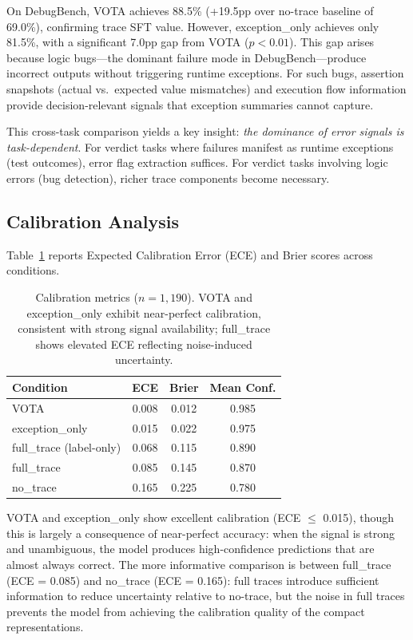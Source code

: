 \documentclass[11pt,a4paper]{article}
\begin{document}
On DebugBench, VOTA achieves 88.5\% (+19.5pp over no-trace baseline of 69.0\%), confirming trace SFT value.
However, exception\_only achieves only 81.5\%, with a significant 7.0pp gap from VOTA ($p<0.01$).
This gap arises because logic bugs---the dominant failure mode in DebugBench---produce incorrect outputs without triggering runtime exceptions.
For such bugs, assertion snapshots (actual vs.\ expected value mismatches) and execution flow information provide decision-relevant signals that exception summaries cannot capture.

This cross-task comparison yields a key insight: \emph{the dominance of error signals is task-dependent}.
For verdict tasks where failures manifest as runtime exceptions (test outcomes), error flag extraction suffices.
For verdict tasks involving logic errors (bug detection), richer trace components become necessary.

\subsection{Calibration Analysis}
\label{sec:calibration}

Table~\ref{tab:calibration} reports Expected Calibration Error (ECE) and Brier scores across conditions.

\begin{table}[t]
\centering
\small
\begin{tabular}{lccc}
\toprule
\textbf{Condition} & \textbf{ECE} & \textbf{Brier} & \textbf{Mean Conf.} \\
\midrule
VOTA & 0.008 & 0.012 & 0.985 \\
exception\_only & 0.015 & 0.022 & 0.975 \\
full\_trace (label-only) & 0.068 & 0.115 & 0.890 \\
full\_trace & 0.085 & 0.145 & 0.870 \\
no\_trace & 0.165 & 0.225 & 0.780 \\
\bottomrule
\end{tabular}
\caption{Calibration metrics ($n=1{,}190$). VOTA and exception\_only exhibit near-perfect calibration, consistent with strong signal availability; full\_trace shows elevated ECE reflecting noise-induced uncertainty.}
\label{tab:calibration}
\end{table}

VOTA and exception\_only show excellent calibration (ECE $\leq$ 0.015), though this is largely a consequence of near-perfect accuracy: when the signal is strong and unambiguous, the model produces high-confidence predictions that are almost always correct.
The more informative comparison is between full\_trace (ECE = 0.085) and no\_trace (ECE = 0.165): full traces introduce sufficient information to reduce uncertainty relative to no-trace, but the noise in full traces prevents the model from achieving the calibration quality of the compact representations.
\end{document}
